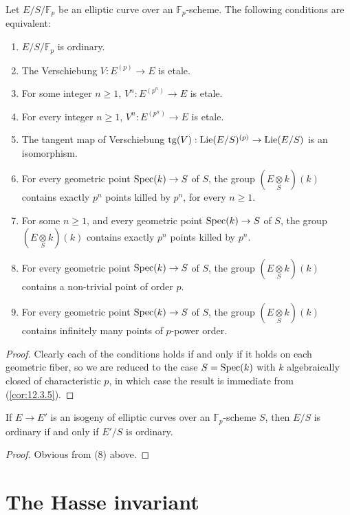 \begin{kprop}\label{prop:12.3.6}
Let $E/S/\mathbb{F}_p$ be an elliptic curve over an $\mathbb{F}_p$-scheme. The following conditions are equivalent:
\begin{enumerate}[label=(\arabic*), start=0]
\item $E/S/\mathbb{F}_p$ is ordinary.
\item The Verschiebung $V : E^{(p)} \to E$ is etale.
\item For some integer $n \ge 1$, $V^n : E^{(p^n)} \to E$ is etale.
\item For every integer $n \ge 1$, $V^n : E^{(p^n)} \to E$ is etale.
\item The tangent map of Verschiebung $\mathrm{tg}(V) : \operatorname{Lie}(E/S)^{(p)} \to \operatorname{Lie}(E/S)$ is an isomorphism.
\item For every geometric point $\operatorname{Spec}(k) \to S$ of $S$, the group $(E \underset{S}{\otimes} k)(k)$ contains exactly $p^n$ points killed by $p^n$, for every $n \ge 1$.
\item For some $n \ge 1$, and every geometric point $\operatorname{Spec}(k) \to S$ of $S$, the group $(E \underset{S}{\otimes} k)(k)$ contains exactly $p^n$ points killed by $p^n$.
\item For every geometric point $\operatorname{Spec}(k) \to S$ of $S$, the group $(E \underset{S}{\otimes} k)(k)$ contains a non-trivial point of order $p$.
\item For every geometric point $\operatorname{Spec}(k) \to S$ of $S$, the group $(E \underset{S}{\otimes} k)(k)$ contains infinitely many points of $p$-power order.
\end{enumerate}
\end{kprop}

\begin{proof}
Clearly each of the conditions holds if and only if it holds on each geometric fiber, so we are reduced to the case $S = \operatorname{Spec}(k)$ with $k$ algebraically closed of characteristic $p$, in which case the result is immediate from (\ref{cor:12.3.5}).
\end{proof}

\begin{kcor}\label{cor:12.3.7}
If $E \to E'$ is an isogeny of elliptic curves over an $\mathbb{F}_p$-scheme $S$, then $E/S$ is ordinary if and only if $E'/S$ is ordinary.
\end{kcor}

\begin{proof}
Obvious from (8) above.
\end{proof}
\section{The Hasse invariant}
\label{sec:12.4}

